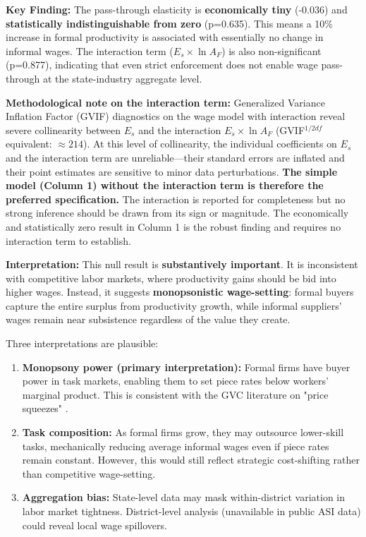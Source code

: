 \noindent \textbf{Key Finding:} The pass-through elasticity is \textbf{economically tiny} (-0.036) and \textbf{statistically indistinguishable from zero} (p=0.635). This means a 10\% increase in formal productivity is associated with essentially no change in informal wages. The interaction term ($E_s \times \ln A_{F}$) is also non-significant (p=0.877), indicating that even strict enforcement does not enable wage pass-through at the state-industry aggregate level.

\noindent \textbf{Methodological note on the interaction term:} Generalized Variance Inflation Factor (GVIF) diagnostics on the wage model with interaction reveal severe collinearity between $E_s$ and the interaction $E_s \times \ln A_F$ (GVIF$^{1/2df}$ equivalent: $\approx 214$). At this level of collinearity, the individual coefficients on $E_s$ and the interaction term are unreliable—their standard errors are inflated and their point estimates are sensitive to minor data perturbations. \textbf{The simple model (Column 1) without the interaction term is therefore the preferred specification.} The interaction is reported for completeness but no strong inference should be drawn from its sign or magnitude. The economically and statistically zero result in Column 1 is the robust finding and requires no interaction term to establish.

\noindent \textbf{Interpretation:} This null result is \textbf{substantively important}. It is inconsistent with competitive labor markets, where productivity gains should be bid into higher wages. Instead, it suggests \textbf{monopsonistic wage-setting}: formal buyers capture the entire surplus from productivity growth, while informal suppliers' wages remain near subsistence regardless of the value they create.

Three interpretations are plausible:

\begin{enumerate}
	\item \textbf{Monopsony power (primary interpretation):} Formal firms have buyer power in task markets, enabling them to set piece rates below workers' marginal product. This is consistent with the GVC literature on "price squeezes" \autocite{nadvi2004global, barrientos2011economic}.
	
	\item \textbf{Task composition:} As formal firms grow, they may outsource lower-skill tasks, mechanically reducing average informal wages even if piece rates remain constant. However, this would still reflect strategic cost-shifting rather than competitive wage-setting.
	
	\item \textbf{Aggregation bias:} State-level data may mask within-district variation in labor market tightness. District-level analysis (unavailable in public ASI data) could reveal local wage spillovers.
\end{enumerate}

